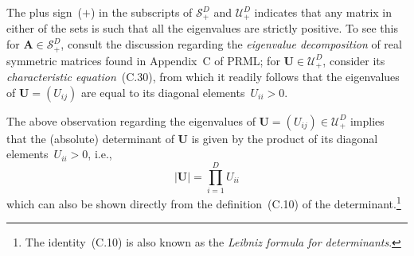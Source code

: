 \documentclass[12pt,a4paper]{article}
\begin{document}
The plus sign~($+$) in the subscripts of $\mathcal{S}_{+}^{D}$ and $\mathcal{U}_{+}^{D}$
indicates that any matrix in either of the sets is such that
all the eigenvalues are strictly positive.
To see this for $\mathbf{A} \in \mathcal{S}_{+}^{D}$,
consult the discussion regarding the \emph{eigenvalue decomposition} of real symmetric matrices
found in Appendix~C of PRML;
for $\mathbf{U} \in \mathcal{U}_{+}^{D}$, consider its \emph{characteristic equation}~(C.30),
from which it readily follows that the eigenvalues of $\mathbf{U} = \left(U_{ij}\right)$ are
equal to its diagonal elements~$U_{ii} > 0$.

The above observation regarding the eigenvalues of
$\mathbf{U} = \left(U_{ij}\right) \in \mathcal{U}_{+}^{D}$
implies that the (absolute) determinant of $\mathbf{U}$ is given by the product of
its diagonal elements~$U_{ii} > 0$, i.e.,
\begin{equation}
\left| \mathbf{U} \right| = \prod_{i=1}^{D} U_{ii}
\label{eq:determinant_of_upper_triangular_matrix}
\end{equation}
which can also be shown directly from the definition~(C.10) of the determinant.\footnote{%
The identity~(C.10) is also known as the \emph{Leibniz formula for determinants}.}
\end{document}
